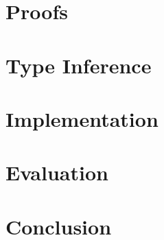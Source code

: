 \documentclass[master=cws,masteroption=ai]{kulemt}
\let\section\chapter
\begin{document}
\section{Proofs}


\section{Type Inference}






\section{Implementation}


\section{Evaluation}


\section{Conclusion}


\appendixpage*          %
\appendix
% 

\backmatter



\end{document}
